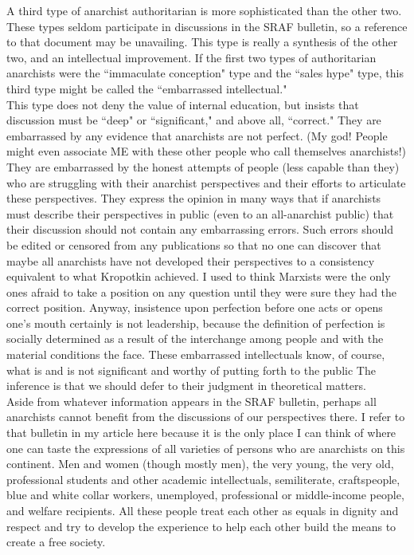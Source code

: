\documentclass[12pt, onecolumn, letterpaper, oneside]{book}
\begin{document}
A third type of anarchist authoritarian is more sophisticated than the other two. These types seldom participate in discussions in the SRAF bulletin, so a reference to that document may be unavailing. This type is really a synthesis of the other two, and an intellectual improvement. If the first two types of authoritarian anarchists were the ``immaculate conception" type and the ``sales hype" type, this third type might be called the ``embarrassed intellectual."\\
This type does not deny the value of internal education, but insists that discussion must be ``deep" or ``significant," and above all, ``correct." They are embarrassed by any evidence that anarchists are not perfect. (My god! People might even associate ME with these other people who call themselves anarchists!) They are embarrassed by the honest attempts of people (less capable than they) who are struggling with their anarchist perspectives and their efforts to articulate these perspectives. They express the opinion in many ways that if anarchists must describe their perspectives in public (even to an all-anarchist public) that their discussion should not contain any embarrassing errors. Such errors should be edited or censored from any publications so that no one can discover that maybe all anarchists have not developed their perspectives to a consistency equivalent to what Kropotkin achieved. I used to think Marxists were the only ones afraid to take a position on any question until they were sure they had the correct position. Anyway, insistence upon perfection before one acts or opens one's mouth certainly is not leadership, because the definition of perfection is socially determined as a result of the interchange among people and with the material conditions the face. These embarrassed intellectuals know, of course, what is and is not significant and worthy of putting forth to the public The inference is that we should defer to their judgment in theoretical matters.\\
Aside from whatever information appears in the SRAF bulletin, perhaps all anarchists cannot benefit from the discussions of our perspectives there. I refer to that bulletin in my article here because it is the only place I can think of where one can taste the expressions of all varieties of persons who are anarchists on this continent. Men and women (though mostly men), the very young, the very old, professional students and other academic intellectuals, semiliterate, craftspeople, blue and white collar workers, unemployed, professional or middle-income people, and welfare recipients. All these people treat each other as equals in dignity and respect and try to develop the experience to help each other build the means to create a free society.\\
\end{document}
